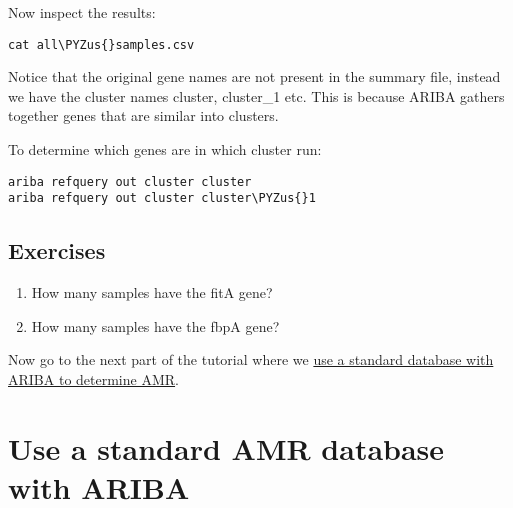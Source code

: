 \documentclass[11pt]{article}
\makeatletter
\providecommand{\tightlist}{%
      \setlength{\itemsep}{0pt}\setlength{\parskip}{0pt}}
\def\PYZus{\char`\_}
\newcommand{\boxspacing}{\kern\kvtcb@left@rule\kern\kvtcb@boxsep}
\newcommand{\prompt}[4]{
         {\ttfamily\llap{{\color{blue}\LARGE\faKeyboardO\hspace{3pt}#4}}\vspace{-\baselineskip}}
    }
\makeatother
\begin{document}
    Now inspect the results:

    \begin{tcolorbox}[breakable, size=fbox, boxrule=1pt, pad at break*=1mm,colback=cellbackground, colframe=cellborder]
\prompt{In}{incolor}{ }{\boxspacing}
\begin{Verbatim}[commandchars=\\\{\}]
cat all\PYZus{}samples.csv
\end{Verbatim}
\end{tcolorbox}

    Notice that the original gene names are not present in the summary file,
instead we have the cluster names cluster, cluster\_1 etc. This is
because ARIBA gathers together genes that are similar into clusters.

To determine which genes are in which cluster run:

    \begin{tcolorbox}[breakable, size=fbox, boxrule=1pt, pad at break*=1mm,colback=cellbackground, colframe=cellborder]
\prompt{In}{incolor}{ }{\boxspacing}
\begin{Verbatim}[commandchars=\\\{\}]
ariba refquery out cluster cluster
ariba refquery out cluster cluster\PYZus{}1
\end{Verbatim}
\end{tcolorbox}

    \hypertarget{exercises}{%
\subsection{Exercises}\label{exercises}}

\begin{enumerate}
\def\labelenumi{\arabic{enumi}.}
\tightlist
\item
  How many samples have the fitA gene?
\item
  How many samples have the fbpA gene?
\end{enumerate}

    Now go to the next part of the tutorial where we
\href{standard_ariba.ipynb}{use a standard database with ARIBA to
determine AMR}.





\newpage





    \hypertarget{use-a-standard-amr-database-with-ariba}{%
\section{Use a standard AMR database with
ARIBA}\label{use-a-standard-amr-database-with-ariba}}
\end{document}
